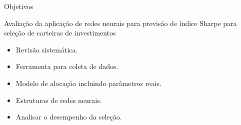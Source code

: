     \begin{frame}{Objetivos}

        \Large 

        Avaliação da aplicação de redes neurais para previsão de índice Sharpe para seleção de carteiras de investimentos
    
        \begin{itemize}
            \item Revisão sistemática.
            \item Ferramenta para coleta de dados.
            \item Modelo de alocação incluindo parâmetros reais.
            \item Estruturas de redes neurais.
            \item Analisar o desempenho da seleção. 
        \end{itemize}


    \end{frame}
